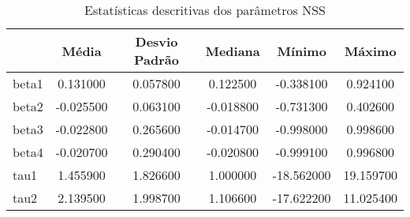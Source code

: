 \begin{table}
\caption{Estatísticas descritivas dos parâmetros NSS}
\label{tab:nss_stats}
\begin{tabular}{lccccc}
\toprule
 & Média & Desvio Padrão & Mediana & Mínimo & Máximo \\
\midrule
beta1 & 0.131000 & 0.057800 & 0.122500 & -0.338100 & 0.924100 \\
beta2 & -0.025500 & 0.063100 & -0.018800 & -0.731300 & 0.402600 \\
beta3 & -0.022800 & 0.265600 & -0.014700 & -0.998000 & 0.998600 \\
beta4 & -0.020700 & 0.290400 & -0.020800 & -0.999100 & 0.996800 \\
tau1 & 1.455900 & 1.826600 & 1.000000 & -18.562000 & 19.159700 \\
tau2 & 2.139500 & 1.998700 & 1.106600 & -17.622200 & 11.025400 \\
\bottomrule
\end{tabular}
\end{table}
